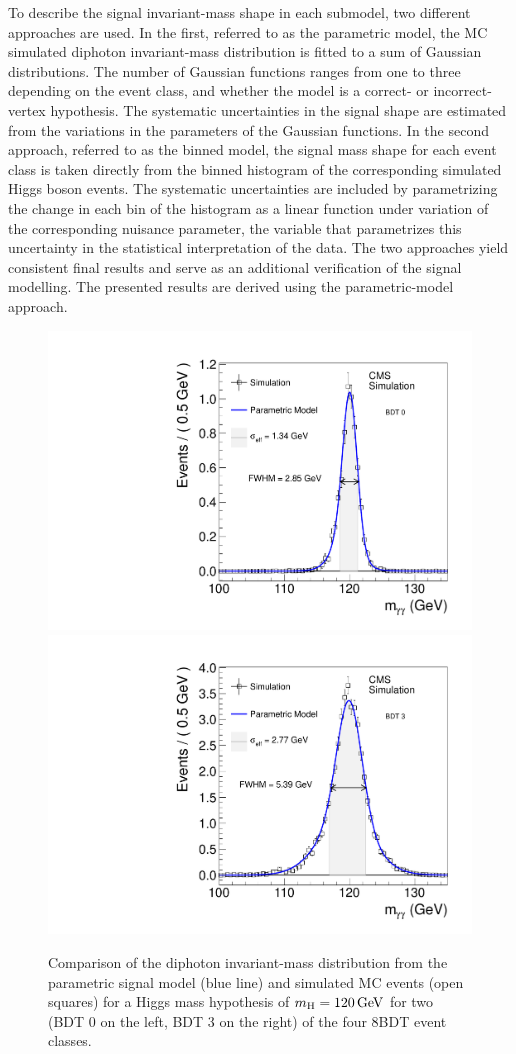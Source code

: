 \documentclass[12pt,twoside,a4paper,cmspaper,final,collab]{cms-tdr}
\begin{document}
To describe the signal invariant-mass shape in each submodel, two different approaches are
used. In the first, referred to as the parametric model, the MC simulated  diphoton invariant-mass
distribution is fitted to a sum of Gaussian distributions. The number
of Gaussian functions ranges from one to three depending on the event class, and whether the model is a
correct- or incorrect-vertex hypothesis.
The systematic uncertainties in the signal shape are estimated from the
variations in the parameters of the Gaussian functions.
In the second approach, referred to as the binned model,  the
signal mass shape for each event class is taken directly from the  binned histogram
of the corresponding simulated Higgs boson events.
The systematic uncertainties are included
by parametrizing the change in each bin of the histogram as a linear function under variation
of the corresponding nuisance parameter, \ie the variable that parametrizes this uncertainty
in the statistical interpretation of the data.
The two approaches yield consistent final results and serve as an additional verification
of the signal modelling. The presented results are derived using the parametric-model approach.

\begin{figure}[htbp]
  \begin{center}
    \includegraphics[width=0.49\linewidth]{figures/hgg_effsigmamvacat0_8TeV.pdf}
    \includegraphics[width=0.49\linewidth]{figures/hgg_effsigmamvacat3_8TeV.pdf}
    \caption{
      Comparison of the diphoton invariant-mass distribution from the parametric signal model (blue line) and simulated
      MC events (open squares) for a Higgs mass
      hypothesis of $m_{\mathrm{H}}=120\,\text{Ge\hspace{-.08em}V}$ for two (BDT 0 on the left, BDT 3 on the right)
      of the four 8\TeV BDT event classes.
    }
    \label{fig:hgg_sigmodel}
  \end{center}
\end{figure}
\end{document}
